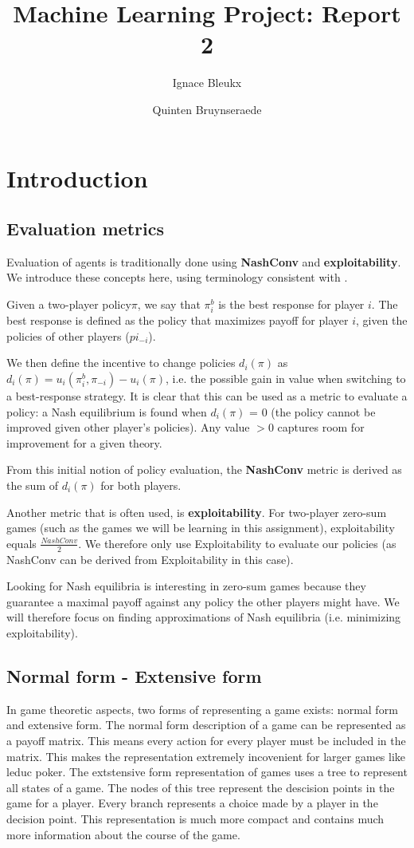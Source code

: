 \documentclass[10pt,a4paper]{article}
\title{Machine Learning Project: Report 2}
\author{Ignace Bleukx \and Quinten Bruynseraede}
\begin{document}
\maketitle
\section{Introduction}
\subsection{Evaluation metrics}
Evaluation of agents is traditionally done using \textbf{NashConv} and \textbf{exploitability}. We introduce these concepts here, using terminology consistent with \citeauthor{lanctot2019openspiel} \citep{lanctot2019openspiel}.

Given a two-player policy$\pi$, we say that $\pi^{b}_{i}$ is the best response for player $i$. The best response is defined as the policy that maximizes payoff for player $i$, given the policies of other players ($pi_{-i}$). 

We then define the incentive to change policies $d_{i}(\pi)$ as $d_{i}(\pi) = u_{i}(\pi^{b}_{i},\pi_{-i}) - u_{i}(\pi)$, i.e. the possible gain in value when switching to a best-response strategy. It is clear that this can be used as a metric to evaluate a policy: a Nash equilibrium is found when $d_{i}(\pi)$ = 0 (the policy cannot be improved given other player's policies). Any value $>0$ captures room for improvement for a given theory. 

From this initial notion of policy evaluation, the \textbf{NashConv} metric is derived as the sum of $d_{i}(\pi)$ for both players.

Another metric that is often used, is \textbf{exploitability}. For two-player zero-sum games (such as the games we will be learning in this assignment), exploitability equals $\frac{NashConv}{2}$. We therefore only use Exploitability to evaluate our policies (as NashConv can be derived from Exploitability in this case).

Looking for Nash equilibria is interesting in zero-sum games because they guarantee a maximal payoff against any policy the other players might have. We will therefore focus on finding approximations of Nash equilibria (i.e. minimizing exploitability). 

\subsection{Normal form - Extensive form}
In game theoretic aspects, two forms of representing a game exists: normal form and extensive form. The normal form description of a game can be represented as a payoff matrix. This means every action for every player must be included in the matrix. This makes the representation extremely incovenient for larger games like leduc poker.
The extstensive form representation of games uses a tree to represent all states of a game. The nodes of this tree represent the descision points in the game for a player. Every branch represents a choice made by a player in the decision point. This representation is much more compact and contains much more information about the course of the game.
\end{document}
